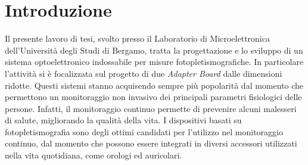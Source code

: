 \documentclass[
	a4paper,
	cleardoublepage=empty,
	headings=twolinechapter,
	numbers=autoenddot,
]{scrbook}
\begin{document}
	\frontmatter
	
	\begin{frontespizio}
		\Margini{3cm}{3cm}{3cm}{3cm}
		\Punteggiatura{}
		\begin{Preambolo*}
			\usepackage[italian]{babel}
			\usepackage[T1]{fontenc}
			\usepackage[utf8]{inputenc}
			\usepackage{microtype}
			\usepackage{lmodern}
			\graphicspath{{img/}}
			
			\renewcommand{\frontinstitutionfont}{\fontsize{14}{17}\bfseries\scshape}
			\renewcommand{\fronttitlefont}{\fontsize{17}{21}\bfseries\scshape}
			\renewcommand{\frontfootfont}{\fontsize{12}{14}\bfseries\scshape}
		\end{Preambolo*}
	\end{frontespizio}
	
	\tableofcontents
	\listoffigures
	\mainmatter
	
	\chapter*{Introduzione}
	Il presente lavoro di tesi, svolto presso il Laboratorio di Microelettronica dell’Università degli Studi di Bergamo, tratta la progettazione e lo sviluppo di un sistema optoelettronico indossabile per misure fotopletismografiche. In particolare l'attività si è focalizzata sul progetto di due \textit{Adapter Board} dalle dimensioni ridotte. Questi sistemi stanno acquisendo sempre più popolarità dal momento che permettono un monitoraggio non invasivo dei principali parametri fisiologici delle persone. Infatti, il monitoraggio continuo permette di prevenire alcuni malesseri di salute, migliorando la qualità della vita. I dispositivi basati su fotopletismografia sono degli ottimi candidati per l'utilizzo nel monitoraggio continuo, dal momento che possono essere integrati in diversi accessori utilizzati nella vita quotidiana, come orologi ed auricolari.
	
\end{document}
